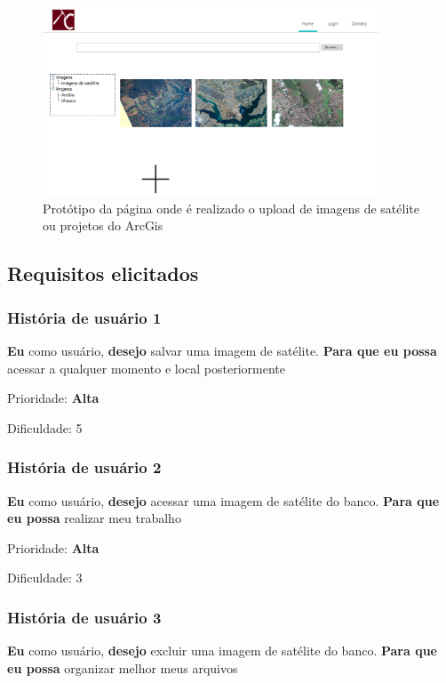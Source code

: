   \begin{figure}[!htb]
    \centering
    \includegraphics[width=10cm, keepaspectratio=false]{figuras/gerencia/pagina-upload.eps}
    \caption{Protótipo da página onde é realizado o upload de imagens de satélite ou projetos do ArcGis}
  \end{figure}

\subsection{Requisitos elicitados}

  \subsubsection{História de usuário 1}
    \textbf{Eu} como usuário, \textbf{desejo} salvar uma imagem de satélite. \textbf{Para que eu possa} acessar a qualquer momento e local posteriormente

    Prioridade: \textbf{Alta}

    Dificuldade: 5

  \subsubsection{História de usuário 2}

    \textbf{Eu} como usuário, \textbf{desejo} acessar uma imagem de satélite do banco. \textbf{Para que eu possa} realizar meu trabalho

    Prioridade: \textbf{Alta}

    Dificuldade: 3

  \subsubsection{História de usuário 3}

    \textbf{Eu} como usuário, \textbf{desejo} excluir uma imagem de satélite do banco. \textbf{Para que eu possa} organizar melhor meus arquivos

